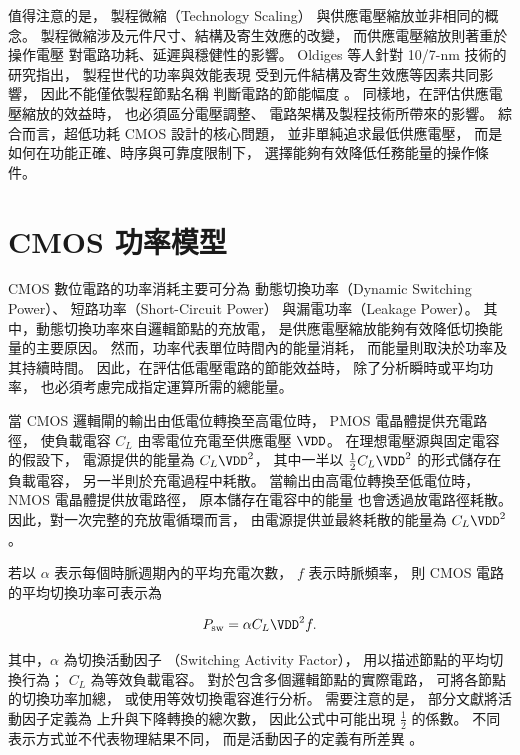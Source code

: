 值得注意的是，
製程微縮（Technology Scaling）
與供應電壓縮放並非相同的概念。
製程微縮涉及元件尺寸、結構及寄生效應的改變，
而供應電壓縮放則著重於操作電壓
對電路功耗、延遲與穩健性的影響。
Oldiges 等人針對 10/7-nm 技術的研究指出，
製程世代的功率與效能表現
受到元件結構及寄生效應等因素共同影響，
因此不能僅依製程節點名稱
判斷電路的節能幅度
\cite{oldiges2020}。
同樣地，在評估供應電壓縮放的效益時，
也必須區分電壓調整、
電路架構及製程技術所帶來的影響。
綜合而言，超低功耗 CMOS 設計的核心問題，
並非單純追求最低供應電壓，
而是如何在功能正確、時序與可靠度限制下，
選擇能夠有效降低任務能量的操作條件。



\section{CMOS 功率模型}
\label{sec:cmos_power_energy}

CMOS 數位電路的功率消耗主要可分為
動態切換功率（Dynamic Switching Power）、
短路功率（Short-Circuit Power）
與漏電功率（Leakage Power）。
其中，動態切換功率來自邏輯節點的充放電，
是供應電壓縮放能夠有效降低切換能量的主要原因。
然而，功率代表單位時間內的能量消耗，
而能量則取決於功率及其持續時間。
因此，在評估低電壓電路的節能效益時，
除了分析瞬時或平均功率，
也必須考慮完成指定運算所需的總能量。

當 CMOS 邏輯閘的輸出由低電位轉換至高電位時，
PMOS 電晶體提供充電路徑，
使負載電容 $C_L$
由零電位充電至供應電壓 $\VDD$。
在理想電壓源與固定電容的假設下，
電源提供的能量為 $C_L\VDD^2$，
其中一半以
$\frac{1}{2}C_L\VDD^2$
的形式儲存在負載電容，
另一半則於充電過程中耗散。
當輸出由高電位轉換至低電位時，
NMOS 電晶體提供放電路徑，
原本儲存在電容中的能量
也會透過放電路徑耗散。
因此，對一次完整的充放電循環而言，
由電源提供並最終耗散的能量為
$C_L\VDD^2$。

若以 $\alpha$ 表示每個時脈週期內的平均充電次數，
$f$ 表示時脈頻率，
則 CMOS 電路的平均切換功率可表示為

\begin{equation}
P_{\mathrm{sw}}
= \alpha C_L\VDD^2 f.
\label{eq:power}
\end{equation}

其中，$\alpha$ 為切換活動因子
（Switching Activity Factor），
用以描述節點的平均切換行為；
$C_L$ 為等效負載電容。
對於包含多個邏輯節點的實際電路，
可將各節點的切換功率加總，
或使用等效切換電容進行分析。
需要注意的是，
部分文獻將活動因子定義為
上升與下降轉換的總次數，
因此公式中可能出現
$\frac{1}{2}$ 的係數。
不同表示方式並不代表物理結果不同，
而是活動因子的定義有所差異
\cite{chandrakasan1992,gonzalez1997}。

